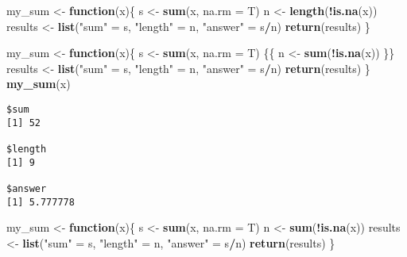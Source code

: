 \documentclass[12pt,letterpaperpaper,openany]{book}
\newenvironment{Shaded}{\begin{snugshade}}{\end{snugshade}}
\newcommand{\ControlFlowTok}[1]{\textcolor[rgb]{0.13,0.29,0.53}{\textbf{#1}}}
\newcommand{\DataTypeTok}[1]{\textcolor[rgb]{0.13,0.29,0.53}{#1}}
\newcommand{\KeywordTok}[1]{\textcolor[rgb]{0.13,0.29,0.53}{\textbf{#1}}}
\newcommand{\NormalTok}[1]{#1}
\newcommand{\OperatorTok}[1]{\textcolor[rgb]{0.81,0.36,0.00}{\textbf{#1}}}
\newcommand{\StringTok}[1]{\textcolor[rgb]{0.31,0.60,0.02}{#1}}
\begin{document}
\begin{Shaded}
\begin{Highlighting}[]
\NormalTok{my_sum <-}\StringTok{ }\ControlFlowTok{function}\NormalTok{(x)\{}
\NormalTok{  s <-}\StringTok{ }\KeywordTok{sum}\NormalTok{(x, }\DataTypeTok{na.rm =}\NormalTok{ T)}
\NormalTok{  n <-}\StringTok{ }\KeywordTok{length}\NormalTok{(}\OperatorTok{!}\KeywordTok{is.na}\NormalTok{(x)) }
\NormalTok{  results <-}\StringTok{ }\KeywordTok{list}\NormalTok{(}\StringTok{"sum"}\NormalTok{ =}\StringTok{ }\NormalTok{s, }\StringTok{"length"}\NormalTok{ =}\StringTok{ }\NormalTok{n, }\StringTok{"answer"}\NormalTok{ =}\StringTok{ }\NormalTok{s}\OperatorTok{/}\NormalTok{n)}
  \KeywordTok{return}\NormalTok{(results) }
\NormalTok{\}}
\end{Highlighting}
\end{Shaded}

\begin{Shaded}
\begin{Highlighting}[]
\NormalTok{my_sum <-}\StringTok{ }\ControlFlowTok{function}\NormalTok{(x)\{}
\NormalTok{  s <-}\StringTok{ }\KeywordTok{sum}\NormalTok{(x, }\DataTypeTok{na.rm =}\NormalTok{ T)}
\NormalTok{\{\{  n <-}\StringTok{ }\KeywordTok{sum}\NormalTok{(}\OperatorTok{!}\KeywordTok{is.na}\NormalTok{(x)) \}\}}
\NormalTok{  results <-}\StringTok{ }\KeywordTok{list}\NormalTok{(}\StringTok{"sum"}\NormalTok{ =}\StringTok{ }\NormalTok{s, }\StringTok{"length"}\NormalTok{ =}\StringTok{ }\NormalTok{n, }\StringTok{"answer"}\NormalTok{ =}\StringTok{ }\NormalTok{s}\OperatorTok{/}\NormalTok{n)}
  \KeywordTok{return}\NormalTok{(results) }
\NormalTok{\}}
\KeywordTok{my_sum}\NormalTok{(x)}
\end{Highlighting}
\end{Shaded}

\begin{verbatim}
$sum
[1] 52

$length
[1] 9

$answer
[1] 5.777778
\end{verbatim}

\begin{Shaded}
\begin{Highlighting}[]
\NormalTok{my_sum <-}\StringTok{ }\ControlFlowTok{function}\NormalTok{(x)\{}
\NormalTok{  s <-}\StringTok{ }\KeywordTok{sum}\NormalTok{(x, }\DataTypeTok{na.rm =}\NormalTok{ T)}
\NormalTok{  n <-}\StringTok{ }\KeywordTok{sum}\NormalTok{(}\OperatorTok{!}\KeywordTok{is.na}\NormalTok{(x)) }
\NormalTok{  results <-}\StringTok{ }\KeywordTok{list}\NormalTok{(}\StringTok{"sum"}\NormalTok{ =}\StringTok{ }\NormalTok{s, }\StringTok{"length"}\NormalTok{ =}\StringTok{ }\NormalTok{n, }\StringTok{"answer"}\NormalTok{ =}\StringTok{ }\NormalTok{s}\OperatorTok{/}\NormalTok{n)}
  \KeywordTok{return}\NormalTok{(results) }
\NormalTok{\}}
\end{Highlighting}
\end{Shaded}
\end{document}
